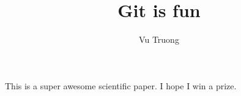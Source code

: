 \documentclass[10pt]{article}
\author{Vu Truong}
\title{Git is fun}
\begin{document}
	\maketitle
	
	This is a super awesome scientific paper.
	I hope I win a prize.
\end{document}
